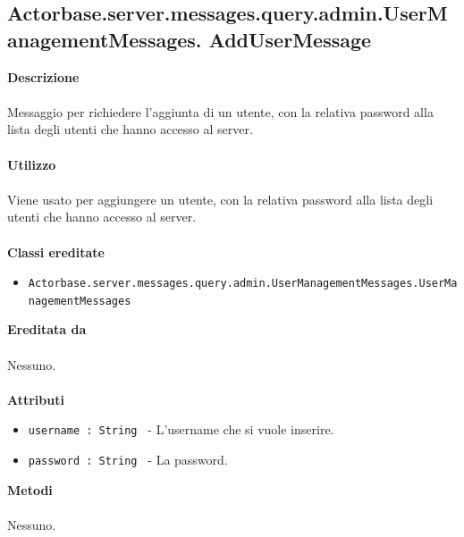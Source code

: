 \documentclass[a4paper]{article}
\begin{document}
	\subsection{Actorbase.server.messages.query.admin.UserManagementMessages.
	\newline AddUserMessage}
		\textbf{Descrizione}
			\\ \\
			Messaggio per richiedere l'aggiunta di un utente, con la relativa password alla lista degli utenti che hanno accesso al server.
			\\ \\
		\textbf{Utilizzo}
			\\ \\
			Viene usato per aggiungere un utente, con la relativa password alla lista degli utenti che hanno accesso al server.
			\\ \\
		\textbf{Classi ereditate}
			\begin{itemize}
				\item \texttt{Actorbase.server.messages.query.admin.UserManagementMessages.UserManagementMessages}
			\end{itemize}
		\textbf{Ereditata da}
			\\ \\
			Nessuno.
			\\ \\
		\textbf{Attributi}
			\begin{itemize}
				\item \texttt{username : String } - L'username che si vuole inserire.
				\item \texttt{password : String } - La password.				
			\end{itemize}
		\textbf{Metodi}
			\\ \\
			Nessuno.	
			
\end{document}
